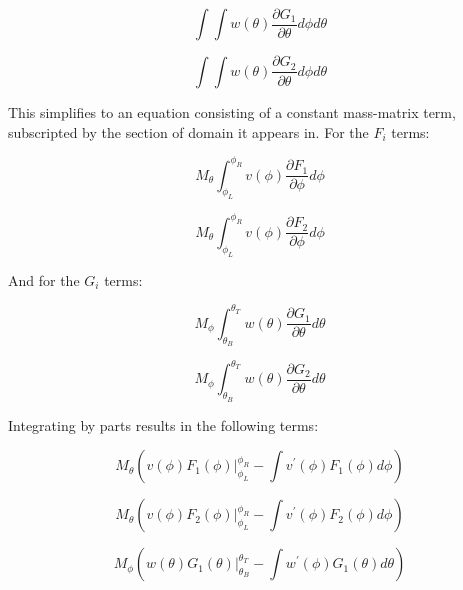 \documentclass[12pt,a4paper,pagesize=pdftex]{scrartcl}
\begin{document}
\begin{equation*}
    \int \int w\left(\theta\right) \frac{\partial G_1}{\partial \theta} d\phi d\theta
\end{equation*}

\begin{equation*}
    \int \int w\left(\theta\right) \frac{\partial G_2}{\partial \theta} d\phi d\theta
\end{equation*}

This simplifies to an equation consisting of a constant mass-matrix term, subscripted by the section of domain it appears in. For the \(F_i\) terms:

\begin{equation*}
    M_\theta \int_{\phi_L}^{\phi_R} v\left(\phi\right) \frac{\partial F_1}{\partial \phi} d\phi
\end{equation*}

\begin{equation*}
    M_\theta \int_{\phi_L}^{\phi_R} v\left(\phi\right) \frac{\partial F_2}{\partial \phi} d\phi
\end{equation*}

And for the \(G_i\) terms:

\begin{equation*}
    M_\phi \int_{\theta_B}^{\theta_T} w\left(\theta\right) \frac{\partial G_1}{\partial \theta} d\theta
\end{equation*}

\begin{equation*}
    M_\phi \int_{\theta_B}^{\theta_T} w\left(\theta\right) \frac{\partial G_2}{\partial \theta} d\theta
\end{equation*}

Integrating by parts results in the following terms:

\begin{equation*}
    M_\theta \left(v\left(\phi\right)F_1\left(\phi\right)\rvert_{\phi_L}^{\phi_R} - \int v^\prime\left(\phi\right) F_1\left(\phi\right) d\phi\right)
\end{equation*}

\begin{equation*}
    M_\theta \left(v\left(\phi\right)F_2\left(\phi\right)\rvert_{\phi_L}^{\phi_R} - \int v^\prime\left(\phi\right) F_2\left(\phi\right) d\phi\right)
\end{equation*}

\begin{equation*}
    M_\phi \left(w\left(\theta\right)G_1\left(\theta\right)\rvert_{\theta_B}^{\theta_T} - \int w^\prime\left(\phi\right) G_1\left(\theta\right) d\theta\right)
\end{equation*}
\end{document}
